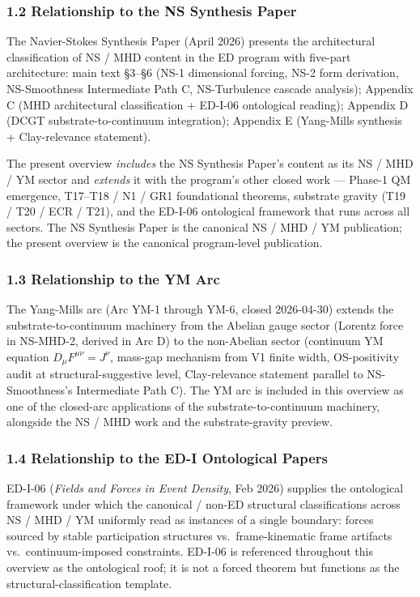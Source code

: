 \documentclass[
  11pt,
  a4paper,
]{article}
\begin{document}
\subsubsection{1.2 Relationship to the NS Synthesis
Paper}\label{relationship-to-the-ns-synthesis-paper}

The Navier-Stokes Synthesis Paper (April 2026) presents the
architectural classification of NS / MHD content in the ED program with
five-part architecture: main text §3--§6 (NS-1 dimensional forcing, NS-2
form derivation, NS-Smoothness Intermediate Path C, NS-Turbulence
cascade analysis); Appendix C (MHD architectural classification +
ED-I-06 ontological reading); Appendix D (DCGT substrate-to-continuum
integration); Appendix E (Yang-Mills synthesis + Clay-relevance
statement).

The present overview \emph{includes} the NS Synthesis Paper's content as
its NS / MHD / YM sector and \emph{extends} it with the program's other
closed work --- Phase-1 QM emergence, T17--T18 / N1 / GR1 foundational
theorems, substrate gravity (T19 / T20 / ECR / T21), and the ED-I-06
ontological framework that runs across all sectors. The NS Synthesis
Paper is the canonical NS / MHD / YM publication; the present overview
is the canonical program-level publication.

\subsubsection{1.3 Relationship to the YM
Arc}\label{relationship-to-the-ym-arc}

The Yang-Mills arc (Arc YM-1 through YM-6, closed 2026-04-30) extends
the substrate-to-continuum machinery from the Abelian gauge sector
(Lorentz force in NS-MHD-2, derived in Arc D) to the non-Abelian sector
(continuum YM equation \(D_\mu F^{\mu\nu} = J^\nu\), mass-gap mechanism
from V1 finite width, OS-positivity audit at structural-suggestive
level, Clay-relevance statement parallel to NS-Smoothness's Intermediate
Path C). The YM arc is included in this overview as one of the
closed-arc applications of the substrate-to-continuum machinery,
alongside the NS / MHD work and the substrate-gravity preview.

\subsubsection{1.4 Relationship to the ED-I Ontological
Papers}\label{relationship-to-the-ed-i-ontological-papers}

ED-I-06 (\emph{Fields and Forces in Event Density}, Feb 2026) supplies
the ontological framework under which the canonical / non-ED structural
classifications across NS / MHD / YM uniformly read as instances of a
single boundary: forces sourced by stable participation structures
vs.~frame-kinematic frame artifacts vs.~continuum-imposed constraints.
ED-I-06 is referenced throughout this overview as the ontological roof;
it is not a forced theorem but functions as the
structural-classification template.
\end{document}
